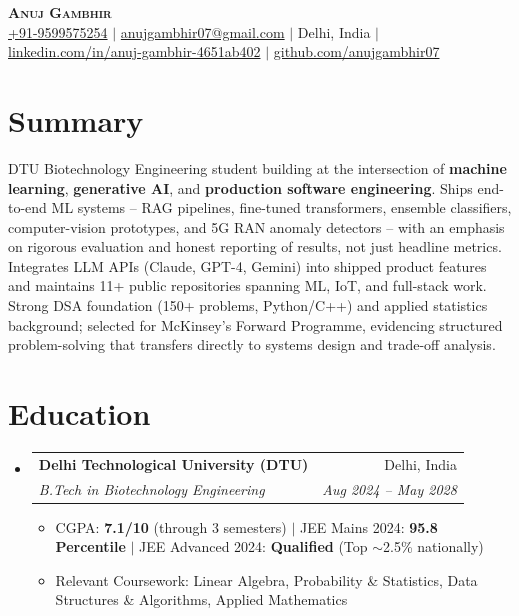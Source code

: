 \documentclass[letterpaper,10.5pt]{article}
\makeatletter
\newcommand{\resumeItem}[1]{
  \item\small{#1 \vspace{-2pt}}
}
\newcommand{\resumeSubheading}[4]{
  \vspace{-2pt}\item
    \begin{tabular*}{0.97\textwidth}[t]{l@{\extracolsep{\fill}}r}
      \textbf{#1} & \small #2 \\
      \textit{\small#3} & \textit{\small #4} \\
    \end{tabular*}\vspace{-5pt}
}
\newcommand{\resumeSubHeadingListStart}{\begin{itemize}[leftmargin=0.12in, label={}]}
\newcommand{\resumeSubHeadingListEnd}{\end{itemize}}
\newcommand{\resumeItemListStart}{\begin{itemize}[leftmargin=0.18in]}
\newcommand{\resumeItemListEnd}{\end{itemize}\vspace{-4pt}}
\makeatother
\begin{document}
\begin{center}
    {\LARGE \scshape \textbf{Anuj Gambhir}} \\ \vspace{3pt}
    \small
    \href{tel:9599575254}{+91-9599575254} $|$
    \href{mailto:anujgambhir07@gmail.com}{anujgambhir07@gmail.com} $|$
    Delhi, India $|$
    \href{https://www.linkedin.com/in/anuj-gambhir-4651ab402/}{linkedin.com/in/anuj-gambhir-4651ab402} $|$
    \href{https://www.github.com/anujgambhir07}{github.com/anujgambhir07}
\end{center}
\vspace{-12pt}

\section{Summary}
\small{DTU Biotechnology Engineering student building at the intersection of \textbf{machine learning}, \textbf{generative AI}, and \textbf{production software engineering}. Ships end-to-end ML systems -- RAG pipelines, fine-tuned transformers, ensemble classifiers, computer-vision prototypes, and 5G RAN anomaly detectors -- with an emphasis on rigorous evaluation and honest reporting of results, not just headline metrics. Integrates LLM APIs (Claude, GPT-4, Gemini) into shipped product features and maintains 11+ public repositories spanning ML, IoT, and full-stack work. Strong DSA foundation (150+ problems, Python/C++) and applied statistics background; selected for McKinsey's Forward Programme, evidencing structured problem-solving that transfers directly to systems design and trade-off analysis.}
\vspace{-4pt}

\section{Education}
\resumeSubHeadingListStart
  \resumeSubheading
    {Delhi Technological University (DTU)}{Delhi, India}
    {B.Tech in Biotechnology Engineering}{Aug 2024 -- May 2028}
    \resumeItemListStart
      \resumeItem{CGPA: \textbf{7.1/10} (through 3 semesters) $|$ JEE Mains 2024: \textbf{95.8 Percentile} $|$ JEE Advanced 2024: \textbf{Qualified} (Top $\sim$2.5\% nationally)}
      \resumeItem{Relevant Coursework: Linear Algebra, Probability \& Statistics, Data Structures \& Algorithms, Applied Mathematics}
    \resumeItemListEnd
\resumeSubHeadingListEnd
\vspace{-6pt}
\end{document}
